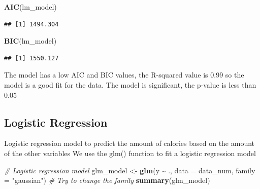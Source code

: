 \documentclass[
]{article}
\newenvironment{Shaded}{\begin{snugshade}}{\end{snugshade}}
\newcommand{\AttributeTok}[1]{\textcolor[rgb]{0.13,0.29,0.53}{#1}}
\newcommand{\CommentTok}[1]{\textcolor[rgb]{0.56,0.35,0.01}{\textit{#1}}}
\newcommand{\FunctionTok}[1]{\textcolor[rgb]{0.13,0.29,0.53}{\textbf{#1}}}
\newcommand{\NormalTok}[1]{#1}
\newcommand{\OtherTok}[1]{\textcolor[rgb]{0.56,0.35,0.01}{#1}}
\newcommand{\SpecialCharTok}[1]{\textcolor[rgb]{0.81,0.36,0.00}{\textbf{#1}}}
\newcommand{\StringTok}[1]{\textcolor[rgb]{0.31,0.60,0.02}{#1}}
\begin{document}
\begin{Shaded}
\begin{Highlighting}[]
\FunctionTok{AIC}\NormalTok{(lm\_model)}
\end{Highlighting}
\end{Shaded}

\begin{verbatim}
## [1] 1494.304
\end{verbatim}

\begin{Shaded}
\begin{Highlighting}[]
\FunctionTok{BIC}\NormalTok{(lm\_model)}
\end{Highlighting}
\end{Shaded}

\begin{verbatim}
## [1] 1550.127
\end{verbatim}

The model has a low AIC and BIC values, the R-squared value is 0.99 so
the model is a good fit for the data. The model is significant, the
p-value is less than 0.05

\subsection{Logistic Regression}\label{logistic-regression}

Logistic regression model to predict the amount of calories based on the
amount of the other variables We use the glm() function to fit a
logistic regression model

\begin{Shaded}
\begin{Highlighting}[]
\CommentTok{\# Logistic regression model}
\NormalTok{glm\_model }\OtherTok{\textless{}{-}} \FunctionTok{glm}\NormalTok{(y }\SpecialCharTok{\textasciitilde{}}\NormalTok{ ., }\AttributeTok{data =}\NormalTok{ data\_num, }\AttributeTok{family =} \StringTok{"gaussian"}\NormalTok{) }
\CommentTok{\# Try to change the family}
\FunctionTok{summary}\NormalTok{(glm\_model)}
\end{Highlighting}
\end{Shaded}
\end{document}
